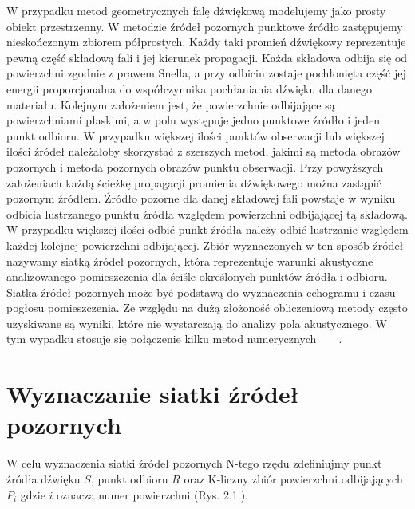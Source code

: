 W przypadku metod geometrycznych falę dźwiękową modelujemy jako prosty obiekt przestrzenny. W metodzie źródeł pozornych punktowe źródło zastępujemy nieskończonym zbiorem półprostych. Każdy taki promień dźwiękowy reprezentuje pewną część składową fali i jej kierunek propagacji. Każda składowa odbija się od powierzchni zgodnie z prawem Snella, a przy odbiciu zostaje pochłonięta część jej energii proporcjonalna do współczynnika pochłaniania dźwięku dla danego materiału. Kolejnym założeniem jest, że powierzchnie odbijające są powierzchniami płaskimi, a w polu występuje jedno  punktowe źródło i jeden punkt odbioru. W przypadku większej ilości punktów obserwacji lub większej ilości źródeł należałoby skorzystać z szerszych metod, jakimi są metoda obrazów pozornych i metoda pozornych obrazów punktu obserwacji. Przy powyższych założeniach  każdą ścieżkę propagacji promienia dźwiękowego można zastąpić pozornym źródłem. Źródło pozorne dla danej składowej fali powstaje w wyniku odbicia lustrzanego punktu źródła względem powierzchni odbijającej tą składową. W przypadku większej ilości odbić punkt źródła należy odbić lustrzanie względem każdej kolejnej powierzchni odbijającej. Zbiór wyznaczonych w ten sposób źródeł nazywamy siatką źródeł pozornych, która reprezentuje warunki akustyczne analizowanego pomieszczenia dla ściśle określonych punktów źródła i odbioru. Siatka źródeł pozornych może być podstawą do wyznaczenia echogramu i czasu pogłosu pomieszczenia. Ze względu na dużą złożoność obliczeniową metody często uzyskiwane są wyniki, które nie wystarczają do analizy pola akustycznego. W tym wypadku stosuje się połączenie kilku metod numerycznych~\cite{b11}~\cite{b12}~\cite{b13}~\cite{b14}.


\section{Wyznaczanie siatki źródeł pozornych}\label{sec:szp}

W celu wyznaczenia siatki źródeł pozornych N-tego rzędu zdefiniujmy punkt źródła dźwięku $S$, punkt odbioru $R$ oraz K-liczny zbiór powierzchni odbijających $P_i$ gdzie $i$ oznacza numer powierzchni (Rys. 2.1.). 

